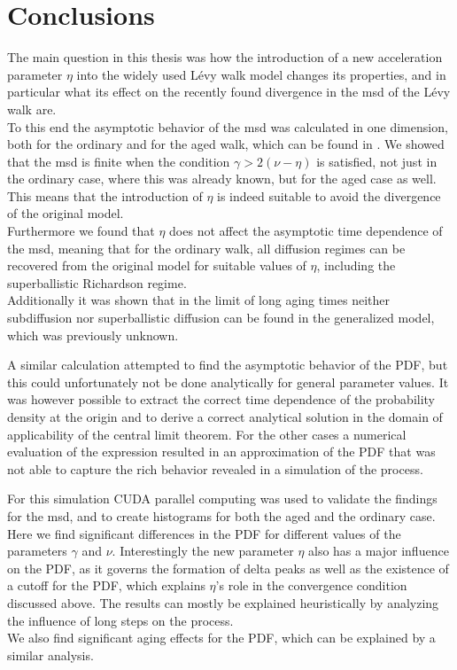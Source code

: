 \chapter{Conclusions}

The main question in this thesis was how the introduction of a new acceleration parameter $\eta$ into the widely used L\'evy walk model changes its properties, and in particular what its effect on the recently found divergence in the \gls*{msd} of the L\'evy walk are. \\
To this end the asymptotic behavior of the \gls*{msd} was calculated in one dimension, both for the ordinary and for the aged walk, which can be found in 
\cite{bothe}. 
We showed that the \gls*{msd} is finite when the condition $\gamma > 2(\nu-\eta)$ is satisfied, not just in the ordinary case, where this was already known\cite{radons2018}, 
but for the aged case as well. This means that the introduction of $\eta$ is indeed suitable to avoid the divergence of the original model. \\
Furthermore we found that $\eta$ does not affect the asymptotic time dependence of the \gls*{msd}, meaning that for the ordinary walk, all diffusion regimes can be recovered from the original model for suitable values of $\eta$, including the superballistic Richardson regime. \\
Additionally it was shown that in the limit of long aging times neither subdiffusion nor superballistic diffusion can be found in the generalized model, which was previously unknown.

A similar calculation attempted to find the asymptotic behavior of the \gls*{PDF}, but this could unfortunately not be done analytically for general parameter values. It was however possible to extract the correct time dependence of the probability density at the origin and to derive a correct analytical solution in the domain of applicability of the central limit theorem. For the other cases a numerical evaluation of the expression resulted in an approximation of the \gls*{PDF} that was not able to capture the rich behavior revealed in a simulation of the process. 

For this simulation CUDA parallel computing was used to validate the findings for the \gls*{msd}, and to create histograms for both the aged and the ordinary case. Here we find significant differences in the \gls*{PDF} for different values of the parameters $\gamma$ and $\nu$. Interestingly the new parameter $\eta$ also has a major influence on the \gls*{PDF}, as it governs the formation of delta peaks as well as the existence of a cutoff for the \gls*{PDF}, which explains $\eta$'s role in the convergence condition discussed above. The results can mostly be explained heuristically by analyzing the influence of long steps on the process. \\
We also find significant aging effects for the \gls*{PDF}, which can be explained by a similar analysis.

